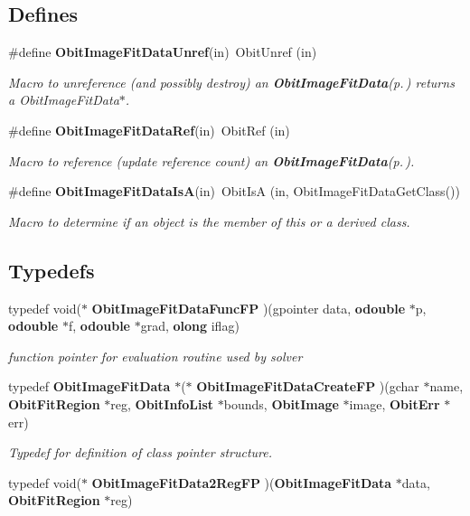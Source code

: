 \subsection*{Defines}
\begin{CompactItemize}
\item 
\#define {\bf Obit\-Image\-Fit\-Data\-Unref}(in)\ Obit\-Unref (in)
\begin{CompactList}\small\item\em Macro to unreference (and possibly destroy) an {\bf Obit\-Image\-Fit\-Data}{\rm (p.\,\pageref{structObitImageFitData})} returns a Obit\-Image\-Fit\-Data$\ast$. \item\end{CompactList}\item 
\#define {\bf Obit\-Image\-Fit\-Data\-Ref}(in)\ Obit\-Ref (in)
\begin{CompactList}\small\item\em Macro to reference (update reference count) an {\bf Obit\-Image\-Fit\-Data}{\rm (p.\,\pageref{structObitImageFitData})}. \item\end{CompactList}\item 
\#define {\bf Obit\-Image\-Fit\-Data\-Is\-A}(in)\ Obit\-Is\-A (in, Obit\-Image\-Fit\-Data\-Get\-Class())
\begin{CompactList}\small\item\em Macro to determine if an object is the member of this or a derived class. \item\end{CompactList}\end{CompactItemize}
\subsection*{Typedefs}
\begin{CompactItemize}
\item 
typedef void($\ast$ {\bf Obit\-Image\-Fit\-Data\-Func\-FP} )(gpointer data, {\bf odouble} $\ast$p, {\bf odouble} $\ast$f, {\bf odouble} $\ast$grad, {\bf olong} iflag)
\begin{CompactList}\small\item\em function pointer for evaluation routine used by solver \item\end{CompactList}\item 
typedef {\bf Obit\-Image\-Fit\-Data} $\ast$($\ast$ {\bf Obit\-Image\-Fit\-Data\-Create\-FP} )(gchar $\ast$name, {\bf Obit\-Fit\-Region} $\ast$reg, {\bf Obit\-Info\-List} $\ast$bounds, {\bf Obit\-Image} $\ast$image, {\bf Obit\-Err} $\ast$err)
\begin{CompactList}\small\item\em Typedef for definition of class pointer structure. \item\end{CompactList}\item 
typedef void($\ast$ {\bf Obit\-Image\-Fit\-Data2Reg\-FP} )({\bf Obit\-Image\-Fit\-Data} $\ast$data, {\bf Obit\-Fit\-Region} $\ast$reg)
\end{CompactItemize}
